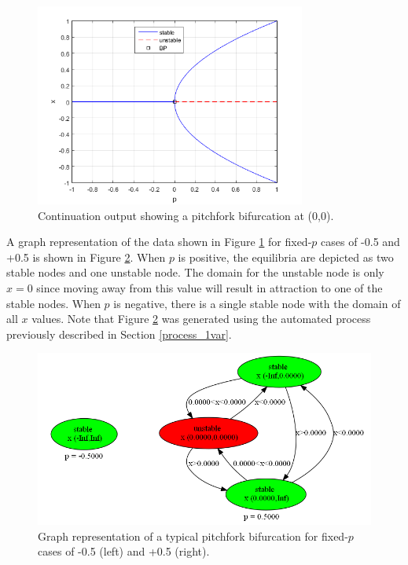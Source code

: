 \documentclass[12pt]{article}
\begin{document}
\begin{figure}[H]
\begin{center}
\includegraphics[width=3.5in]{jan13_bfd_pf1.png}
\caption{Continuation output showing a pitchfork bifurcation at (0,0).}
\label{jan13_bfd_pf1}
\end{center}
\end{figure}

A graph representation of the data shown in Figure \ref{jan13_bfd_pf1} for fixed-$p$ cases of -0.5 and +0.5 is shown in Figure \ref{jan13_graph_pf2}. When $p$ is positive, the equilibria are depicted as two stable nodes and one unstable node. The domain for the unstable node is only $x=0$ since moving away from this value will result in attraction to one of the stable nodes. When $p$ is negative, there is a single stable node with the domain of all $x$ values. Note that Figure \ref{jan13_graph_pf2} was generated using the automated process previously described in Section \ref{process_1var}.

\begin{figure}[H]
\begin{center}
\includegraphics[width=5in]{jan13_graph_pf2.png}
\caption{Graph representation of a typical pitchfork bifurcation for fixed-$p$ cases of -0.5 (left) and +0.5 (right).}
\label{jan13_graph_pf2}
\end{center}
\end{figure}
\end{document}
